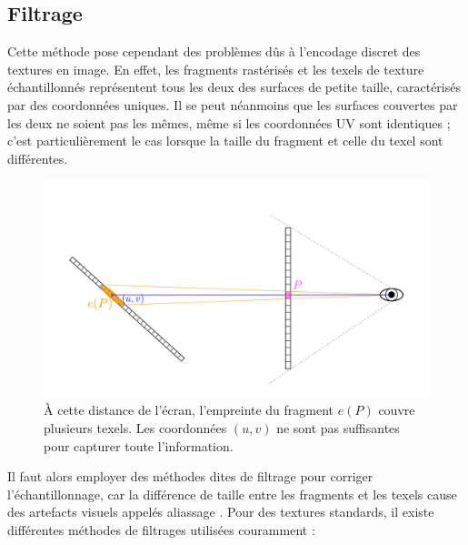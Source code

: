\subsection*{Filtrage}

Cette méthode pose cependant des problèmes dûs à l'encodage discret des textures en image. En effet, les fragments rastérisés et les texels de texture échantillonnés représentent tous les deux des surfaces de petite taille, caractérisés par des coordonnées uniques. Il se peut néanmoins que les surfaces couvertes par les deux ne soient pas les mêmes, même si les coordonnées UV sont identiques ; c'est particulièrement le cas lorsque la taille du fragment et celle du texel sont différentes.

\bigskip

\begin{figure}
    \centering
    \includegraphics[width=\textwidth]{contenu/resources/images/schema_filtrage}
    \caption[Visualisation du problème d'échantillonnage lors du rendu par rastérisation]{À cette distance de l'écran, l'empreinte du fragment $e(P)$ couvre plusieurs texels. Les coordonnées $(u, v)$ ne sont pas suffisantes pour capturer toute l'information.}
    \label{fig:aliasing}
\end{figure}

Il faut alors employer des méthodes dites de \og filtrage \fg pour corriger l'échantillonnage, car la différence de taille entre les fragments et les texels cause des artefacts visuels appelés \og aliassage \fg. Pour des textures standards, il existe différentes méthodes de filtrages utilisées couramment :

